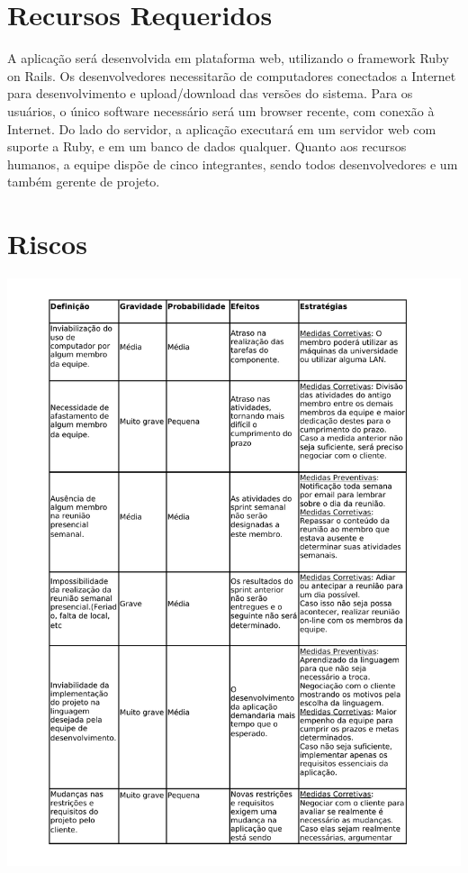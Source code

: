 \documentclass[11pt]{article}
\begin{document}


\section{Recursos Requeridos}

A aplicação será desenvolvida em plataforma web, utilizando o framework Ruby on
Rails. Os desenvolvedores necessitarão de computadores conectados a Internet para
desenvolvimento e upload/download das versões do sistema. Para os usuários, o único
software necessário será um browser recente, com conexão à Internet. Do lado do
servidor, a aplicação executará em um servidor web com suporte a Ruby, e em um
banco de dados qualquer.
Quanto aos recursos humanos, a equipe dispõe de cinco integrantes, sendo todos
desenvolvedores e um também gerente de projeto.



\section{Riscos}

\includegraphics[width=1.30\textwidth]{riscos.pdf}\\
\end{document}
